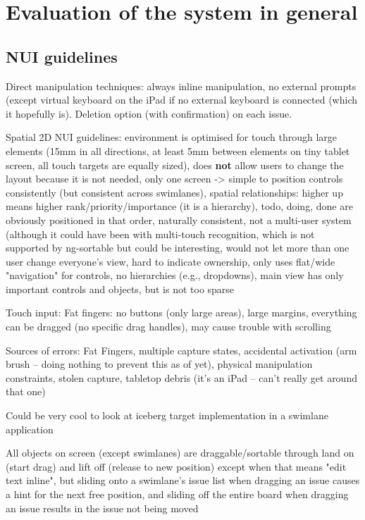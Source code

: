 \section{Evaluation of the system in general}

\subsection{NUI guidelines}

Direct manipulation techniques: always inline manipulation, no external prompts (except virtual keyboard on the iPad if no external keyboard is connected (which it hopefully is). Deletion option (with confirmation) on each issue.

Spatial 2D NUI guidelines: environment is optimised for touch through large elements (15mm in all directions, at least 5mm between elements on tiny tablet screen, all touch targets are equally sized), does \textbf{not} allow users to change the layout because it is not needed, only one screen -> simple to position controls consistently (but consistent across swimlanes), spatial relationships: higher up means higher rank/priority/importance (it is a hierarchy), todo, doing, done are obviously positioned in that order, naturally consistent, not a multi-user system (although it could have been with multi-touch recognition, which is not supported by ng-sortable but could be interesting, would not let more than one user change everyone's view, hard to indicate ownership, only uses flat/wide "navigation" for controls, no hierarchies (e.g., dropdowns), main view has only important controls and objects, but is not too sparse


Touch input: Fat fingers: no buttons (only large areas), large margins, everything can be dragged (no specific drag handles), may cause trouble with scrolling

Sources of errors: Fat Fingers, multiple capture states, accidental activation (arm brush – doing nothing to prevent this as of yet), physical manipulation constraints, stolen capture, tabletop debris (it's an iPad – can't really get around that one)

Could be very cool to look at iceberg target implementation in a swimlane application %

All objects on screen (except swimlanes) are draggable/sortable through land on (start drag) and lift off (release to new position) except when that means "edit text inline", but sliding onto a swimlane's issue list when dragging an issue causes a hint for the next free position, and sliding off the entire board when dragging an issue results in the issue not being moved %

